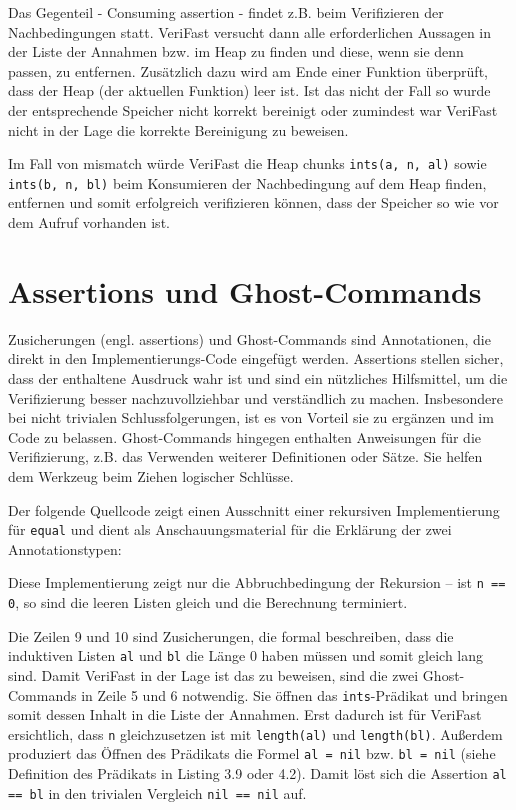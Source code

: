 Das Gegenteil - \glqq Consuming assertion\grqq{} - findet z.B. beim Verifizieren der Nachbedingungen statt.
VeriFast versucht dann alle erforderlichen Aussagen in der Liste der Annahmen bzw. im Heap zu finden
und diese, wenn sie denn passen, zu entfernen. Zusätzlich dazu wird am Ende einer Funktion überprüft, 
dass der Heap (der aktuellen Funktion) leer ist. Ist das nicht der Fall so wurde der entsprechende Speicher 
nicht korrekt bereinigt oder zumindest war VeriFast nicht in der Lage die korrekte Bereinigung zu beweisen.

Im Fall von mismatch würde VeriFast die Heap chunks \lstinline{ints(a, n, al)} sowie
\mbox{\lstinline{ints(b, n, bl)}} beim Konsumieren der Nachbedingung auf dem Heap finden, entfernen und
somit erfolgreich verifizieren können, dass der Speicher so wie vor dem Aufruf vorhanden ist.



\section{Assertions und Ghost-Commands}

Zusicherungen (engl. assertions) und Ghost-Commands sind Annotationen, die direkt in den Implementierungs-Code
eingefügt werden. Assertions stellen sicher, dass der enthaltene Ausdruck wahr ist und sind ein nützliches Hilfsmittel, 
um die Verifizierung besser nachzuvollziehbar und verständlich zu machen. Insbesondere bei 
nicht trivialen Schlussfolgerungen, ist es von Vorteil sie zu ergänzen und im Code zu belassen. Ghost-Commands hingegen 
enthalten Anweisungen für die Verifizierung, z.B. das Verwenden weiterer Definitionen oder Sätze. Sie helfen dem Werkzeug 
beim Ziehen logischer Schlüsse.

Der folgende Quellcode zeigt einen Ausschnitt einer rekursiven Implementierung für \lstinline{equal} und dient
als Anschauungsmaterial für die Erklärung der zwei Annotationstypen:



Diese Implementierung zeigt nur die Abbruchbedingung der Rekursion -- ist \lstinline{n == 0}, so sind die
leeren Listen gleich und die Berechnung terminiert. 

Die Zeilen 9 und 10 sind Zusicherungen, die formal beschreiben, dass die induktiven Listen \lstinline{al} und
\lstinline{bl} die Länge 0 haben müssen und somit gleich lang sind. Damit VeriFast in der Lage ist das zu
beweisen, sind die zwei Ghost-Commands in Zeile 5 und 6 notwendig. Sie öffnen das \lstinline{ints}-Prädikat
und bringen somit dessen Inhalt in die Liste der Annahmen. Erst dadurch ist für VeriFast ersichtlich, dass 
\lstinline{n} gleichzusetzen ist mit \texttt{length(al)} und \texttt{length(bl)}. Außerdem produziert
das Öffnen des Prädikats die Formel \lstinline{al = nil} bzw. \lstinline{bl = nil} (siehe Definition
des Prädikats in Listing 3.9 oder 4.2). Damit löst sich die Assertion \lstinline{al == bl} in den
trivialen Vergleich \lstinline{nil == nil} auf.

